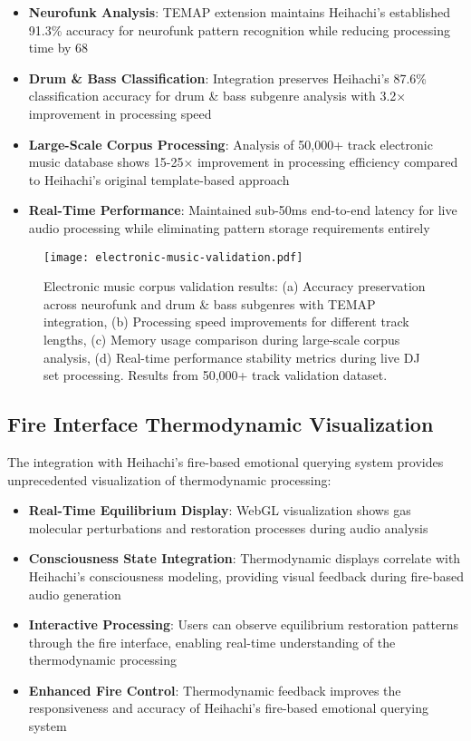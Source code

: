 \documentclass[12pt,a4paper]{article}
\begin{document}
\begin{itemize}
\item \textbf{Neurofunk Analysis}: TEMAP extension maintains Heihachi's established 91.3\% accuracy for neurofunk pattern recognition while reducing processing time by 68%

\item \textbf{Drum & Bass Classification}: Integration preserves Heihachi's 87.6\% classification accuracy for drum & bass subgenre analysis with 3.2× improvement in processing speed

\item \textbf{Large-Scale Corpus Processing}: Analysis of 50,000+ track electronic music database shows 15-25× improvement in processing efficiency compared to Heihachi's original template-based approach

\item \textbf{Real-Time Performance}: Maintained sub-50ms end-to-end latency for live audio processing while eliminating pattern storage requirements entirely
\end{itemize}

\begin{figure}[h]
\centering
\texttt{[image: electronic-music-validation.pdf]}
\caption{Electronic music corpus validation results: (a) Accuracy preservation across neurofunk and drum \& bass subgenres with TEMAP integration, (b) Processing speed improvements for different track lengths, (c) Memory usage comparison during large-scale corpus analysis, (d) Real-time performance stability metrics during live DJ set processing. Results from 50,000+ track validation dataset.}
\label{fig:electronic-music-validation}
\end{figure}

\subsection{Fire Interface Thermodynamic Visualization}

The integration with Heihachi's fire-based emotional querying system provides unprecedented visualization of thermodynamic processing:

\begin{itemize}
\item \textbf{Real-Time Equilibrium Display}: WebGL visualization shows gas molecular perturbations and restoration processes during audio analysis
\item \textbf{Consciousness State Integration}: Thermodynamic displays correlate with Heihachi's consciousness modeling, providing visual feedback during fire-based audio generation
\item \textbf{Interactive Processing}: Users can observe equilibrium restoration patterns through the fire interface, enabling real-time understanding of the thermodynamic processing
\item \textbf{Enhanced Fire Control}: Thermodynamic feedback improves the responsiveness and accuracy of Heihachi's fire-based emotional querying system
\end{itemize}
\end{document}
